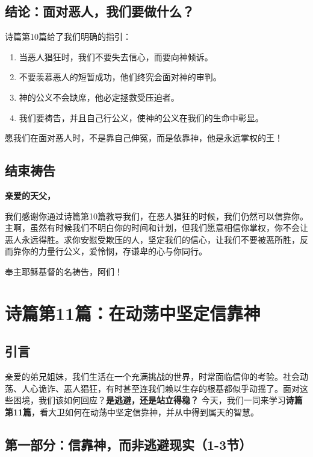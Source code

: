 \documentclass[a4paper, 12pt]{article}
\begin{document}
\subsection*{结论：面对恶人，我们要做什么？}

诗篇第10篇给了我们明确的指引：  

\begin{enumerate}
    \item 当恶人猖狂时，我们不要失去信心，而要向神倾诉。
    \item 不要羡慕恶人的短暂成功，他们终究会面对神的审判。
    \item 神的公义不会缺席，他必定拯救受压迫者。
    \item 我们要祷告，并且自己行公义，使神的公义在我们的生命中彰显。
\end{enumerate}

愿我们在面对恶人时，不是靠自己伸冤，而是依靠神，他是永远掌权的王！  

\subsection*{结束祷告}

\textbf{亲爱的天父，}

我们感谢你通过诗篇第10篇教导我们，在恶人猖狂的时候，我们仍然可以信靠你。主啊，虽然有时候我们不明白你的时间和计划，但我们愿意相信你掌权，你不会让恶人永远得胜。求你安慰受欺压的人，坚定我们的信心，让我们不要被恶所胜，反而靠你的力量行公义，爱怜悯，存谦卑的心与你同行。

奉主耶稣基督的名祷告，阿们！

\newpage
\section{诗篇第11篇：在动荡中坚定信靠神}
\subsection*{引言}

亲爱的弟兄姐妹，我们生活在一个充满挑战的世界，时常面临信仰的考验。社会动荡、人心诡诈、恶人猖狂，有时甚至连我们赖以生存的根基都似乎动摇了。面对这些困境，我们该如何回应？\textbf{是逃避，还是站立得稳？} 今天，我们一同来学习\textbf{诗篇第11篇}，看大卫如何在动荡中坚定信靠神，并从中得到属天的智慧。 


\subsection*{第一部分：信靠神，而非逃避现实（1-3节）}
\end{document}
